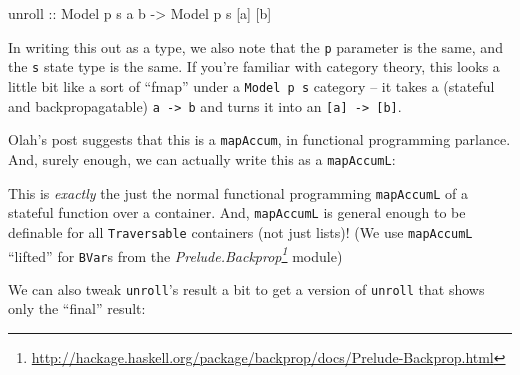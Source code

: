 \documentclass[]{article}
\newenvironment{Shaded}{}{}
\newcommand{\CommentTok}[1]{\textcolor[rgb]{0.38,0.63,0.69}{\textit{#1}}}
\newcommand{\DataTypeTok}[1]{\textcolor[rgb]{0.56,0.13,0.00}{#1}}
\newcommand{\FunctionTok}[1]{\textcolor[rgb]{0.02,0.16,0.49}{#1}}
\newcommand{\KeywordTok}[1]{\textcolor[rgb]{0.00,0.44,0.13}{\textbf{#1}}}
\newcommand{\NormalTok}[1]{#1}
\newcommand{\OtherTok}[1]{\textcolor[rgb]{0.00,0.44,0.13}{#1}}
\renewcommand{\href}[2]{#2\footnote{\url{#1}}}
\begin{document}
\begin{Shaded}
\begin{Highlighting}[]
\OtherTok{unroll ::} \DataTypeTok{Model}\NormalTok{ p s a b }\OtherTok{->} \DataTypeTok{Model}\NormalTok{ p s [a] [b]}
\end{Highlighting}
\end{Shaded}

In writing this out as a type, we also note that the \texttt{p} parameter is the
same, and the \texttt{s} state type is the same. If you're familiar with
category theory, this looks a little bit like a sort of ``fmap'' under a
\texttt{Model\ p\ s} category -- it takes a (stateful and backpropagatable)
\texttt{a\ -\textgreater{}\ b} and turns it into an
\texttt{{[}a{]}\ -\textgreater{}\ {[}b{]}}.

Olah's post suggests that this is a \texttt{mapAccum}, in functional programming
parlance. And, surely enough, we can actually write this as a
\texttt{mapAccumL}:

\begin{Shaded}
\end{Shaded}

This is \emph{exactly} the just the normal functional programming
\texttt{mapAccumL} of a stateful function over a container. And,
\texttt{mapAccumL} is general enough to be definable for all
\texttt{Traversable} containers (not just lists)! (We use \texttt{mapAccumL}
``lifted'' for \texttt{BVar}s from the
\emph{\href{http://hackage.haskell.org/package/backprop/docs/Prelude-Backprop.html}{Prelude.Backprop}}
module)

We can also tweak \texttt{unroll}'s result a bit to get a version of
\texttt{unroll} that shows only the ``final'' result:
\end{document}
